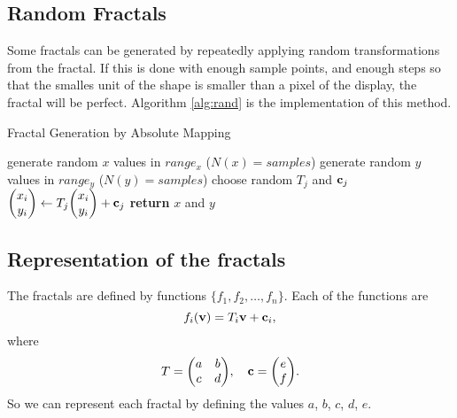 \documentclass[12pt,a4paper]{article}
\begin{document}
    \subsection{Random Fractals}
    Some fractals can be generated by repeatedly applying random transformations from the fractal. If this is done with enough
    sample points, and enough steps so that the smalles unit of the shape is smaller than a pixel of the display, the fractal
    will be perfect. Algorithm \ref{alg:rand} is the implementation of this method.
    \begin{algorithm}
        \caption{Fractal Generation by Absolute Mapping}
        \label{alg:rand}
        \begin{algorithmic}[1]
                \State generate random $x$ values in $range_x$ ($N(x)=samples$)
                \State generate random $y$ values in $range_y$ ($N(y)=samples$)
                        \State choose random $T_j$ and $\vb{c}_j$
                        \State $\mqty(x_i \\ y_i)\gets T_j\mqty(x_i \\ y_i) + \vb{c}_j$
                    \EndFor
                \EndFor
                \State \textbf{return} $x$ and $y$
            \EndFunction
        \end{algorithmic}
    \end{algorithm}
    \subsection{Representation of the fractals}
    The fractals are defined by functions $\{f_1, f_2, \dots, f_n\}$. Each of the functions are
    \begin{equation}
        f_i(\vb{v}) = T_i\vb{v} + \vb{c}_i,
    \end{equation}
    where
    \begin{gather}
        T = \mqty(a & b \\ c & d),\quad \vb{c} = \mqty(e \\ f).
    \end{gather}
    So we can represent each fractal by defining the values $a$, $b$, $c$, $d$, $e$.
\end{document}
